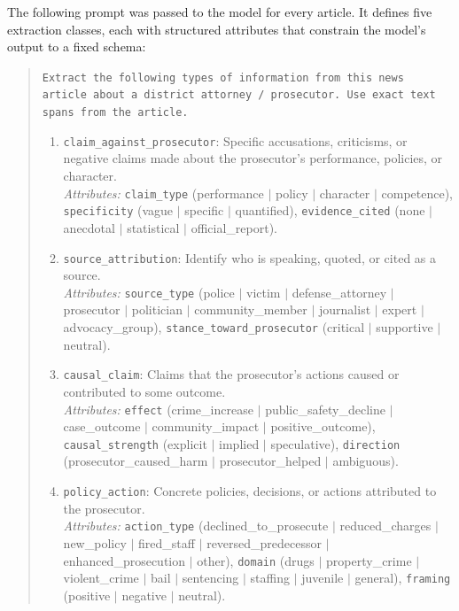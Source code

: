 \documentclass[12pt, letterpaper]{article}
\begin{document}
\begin{appendices}
The following prompt was passed to the model for every article. It defines five extraction classes, each with structured attributes that constrain the model's output to a fixed schema:

\begin{quote}
\small
\texttt{Extract the following types of information from this news article about a district attorney / prosecutor. Use exact text spans from the article.}

\begin{enumerate}[leftmargin=*]
\item \texttt{claim\_against\_prosecutor}: Specific accusations, criticisms, or negative claims made about the prosecutor's performance, policies, or character.\\
\emph{Attributes:} \texttt{claim\_type} (performance $|$ policy $|$ character $|$ competence), \texttt{specificity} (vague $|$ specific $|$ quantified), \texttt{evidence\_cited} (none $|$ anecdotal $|$ statistical $|$ official\_report).

\item \texttt{source\_attribution}: Identify who is speaking, quoted, or cited as a source.\\
\emph{Attributes:} \texttt{source\_type} (police $|$ victim $|$ defense\_attorney $|$ prosecutor $|$ politician $|$ community\_member $|$ journalist $|$ expert $|$ advocacy\_group), \texttt{stance\_toward\_prosecutor} (critical $|$ supportive $|$ neutral).

\item \texttt{causal\_claim}: Claims that the prosecutor's actions caused or contributed to some outcome.\\
\emph{Attributes:} \texttt{effect} (crime\_increase $|$ public\_safety\_decline $|$ case\_outcome $|$ community\_impact $|$ positive\_outcome), \texttt{causal\_strength} (explicit $|$ implied $|$ speculative), \texttt{direction} (prosecutor\_caused\_harm $|$ prosecutor\_helped $|$ ambiguous).

\item \texttt{policy\_action}: Concrete policies, decisions, or actions attributed to the prosecutor.\\
\emph{Attributes:} \texttt{action\_type} (declined\_to\_prosecute $|$ reduced\_charges $|$ new\_policy $|$ fired\_staff $|$ reversed\_predecessor $|$ enhanced\_prosecution $|$ other), \texttt{domain} (drugs $|$ property\_crime $|$ violent\_crime $|$ bail $|$ sentencing $|$ staffing $|$ juvenile $|$ general), \texttt{framing} (positive $|$ negative $|$ neutral).


\end{enumerate}
\end{quote}
\end{appendices}
\end{document}
